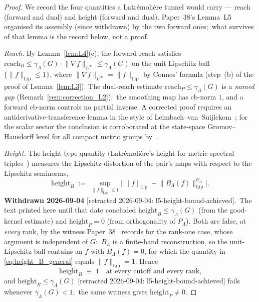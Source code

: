 \documentclass[11pt,a4paper]{article}
\theoremstyle{plain}
\theoremstyle{definition}
\newcommand{\Lammax}{\Lambda}
\newcommand{\Op}{\mathcal{O}}
\newcommand{\Lipnorm}[1]{\lVert #1 \rVert_{\mathrm{Lip}}}
\newcommand{\norm}[1]{\lVert #1 \rVert}
\begin{document}
\begin{proof}
We record the four quantities a Latr\'emoli\`ere tunnel would carry ---
reach (forward and dual) and height (forward and dual). Paper~38's
Lemma~L5 organised its assembly (since withdrawn) by the two forward ones;\
what survives of that lemma is the record below, not a proof.

\emph{Reach.} By Lemma~\ref{lem:L4}(c), the forward reach satisfies
$\mathrm{reach}_B \le \gamma_\Lammax(G) \cdot \norm{\nabla f}_{L^\infty}
\le \gamma_\Lammax(G)$ on the unit Lipschitz ball $\{\Lipnorm{f} \le 1\}$,
where $\norm{\nabla f}_{L^\infty} = \Lipnorm{f}$ by Connes' formula
(step~(b) of the proof of Lemma~\ref{lem:L3}).
The dual-reach estimate $\mathrm{reach}_P \le \gamma_\Lammax(G)$ is a
\emph{named gap} (Remark~\ref{rem:correction_L2}):\ the smoothing map
has cb-norm $1$, and a forward cb-norm controls no partial
inverse. A corrected proof requires an antiderivative-transference
lemma in the style of Leimbach--van~Suijlekom~\cite{leimbach_vs2024};
for the scalar sector the conclusion is corroborated at the
state-space Gromov--Hausdorff level for all compact metric groups
by~\cite{gaudillot_estrada_vs2025}.

\emph{Height.} The height-type quantity (Latr\'emoli\`ere's height for
metric spectral triples~\cite{latremoliere_metric_st_2017}) measures the
Lipschitz-distortion of the pair's maps with respect to the Lipschitz
seminorms,
\begin{equation}\label{eq:height_B_general}
   \mathrm{height}_B
   \;:=\; \sup_{\Lipnorm{f} \le 1}
   \bigl|\,\Lipnorm{f} - \Lipnorm{B_\Lammax(f)}^{\Op_\Lammax}\bigr|.
\end{equation}
\textbf{Withdrawn 2026-09-04}
[retracted 2026-09-04: l5-height-bound-achieved].\ The text printed here
until that date concluded $\mathrm{height}_B \le \gamma_\Lammax(G)$ (from
the good-kernel estimate) and $\mathrm{height}_P = 0$ (from orthogonality
of $P_\Lammax$). Both are false, at \emph{every} rank, by the witness
Paper~38~\cite{paper38} records for the rank-one case, whose argument is
independent of $G$:\ $B_\Lammax$ is a finite-band reconstruction, so the
unit-Lipschitz ball contains an $f$ with $B_\Lammax(f) = 0$, for which the
quantity in \eqref{eq:height_B_general} equals $\Lipnorm{f} = 1$. Hence
\begin{equation}\label{eq:height_one_general}
   \mathrm{height}_B \;\equiv\; 1
   \quad\text{at every cutoff and every rank,}
\end{equation}
and $\mathrm{height}_B \le \gamma_\Lammax(G)$
[retracted 2026-09-04: l5-height-bound-achieved] fails whenever
$\gamma_\Lammax(G) < 1$;\ the same witness gives
$\mathrm{height}_P \ne 0$.


\end{proof}
\end{document}
